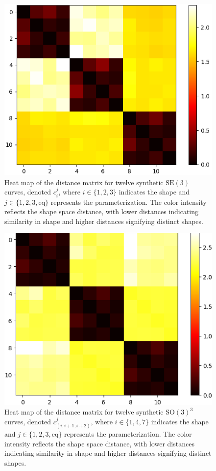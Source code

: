 \begin{figure}
    \centering
    \includegraphics[width=0.7\linewidth]{figures/syntetic_data/distance_matrix/SE3.png}
    \caption[Classification using reparameterization of curves in \(\mathrm{SE}(3)\)]{Heat map of the distance matrix for twelve synthetic \(\mathrm{SE}(3)\) curves, denoted \(c_i^j\), where \(i \in \{1, 2, 3\}\) indicates the shape and \(j \in \{1, 2, 3, \text{eq}\}\) represents the parameterization. The color intensity reflects the shape space distance, with lower distances indicating similarity in shape and higher distances signifying distinct shapes.}
    \label{fig:classification-SE3}
\end{figure}

\begin{figure}
    \centering
    \includegraphics[width=0.7\linewidth]{figures/syntetic_data/distance_matrix/SO3_3.png}
    \caption[Classification using reparameterization of curves in \(\mathrm{SO}(3)^3\)]{Heat map of the distance matrix for twelve synthetic \(\mathrm{SO}(3)^3\) curves, denoted \(c_{(i,i+1,i+2)}^j\), where \(i \in \{1, 4, 7\}\) indicates the shape and \(j \in \{1, 2, 3, \text{eq}\}\) represents the parameterization. The color intensity reflects the shape space distance, with lower distances indicating similarity in shape and higher distances signifying distinct shapes.}
    \label{fig:classification-SO3-3}
\end{figure}

